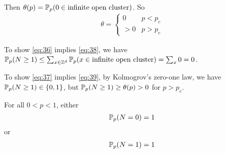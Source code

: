 Then $\theta(p) = \Prob_{p}(0 \in \text{infinite open cluster})$. So
\begin{align}
  \theta =
  \begin{cases}
    0 & p  < p_{c} \\
    > 0 & p > p_{c}
  \end{cases}
\end{align}

To show \eqref{eq:36} implies \eqref{eq:38}, we have $\Prob_{p}(N \geq
1) \leq \sum_{x \in \Z^{d}}\Prob_{p}(x \in \text{infinite open
  cluster}) = \sum_{x} 0 = 0$.

To show \eqref{eq:37} implies \eqref{eq:39}, by Kolmogrov's zero-one law, we have $\Prob_{p}(N \geq 1) \in \{ 0, 1
\}$, but $\Prob_{p}(N \geq 1) \geq \theta(p) > 0$ for $p > p_{c}$.

\begin{thm}
  \label{defn:random_walks_on_graphs:19}
  For all $0 < p < 1$, either
  \begin{align}
    \label{eq:41}
    \Prob_{p}(N = 0) = 1
  \end{align} or
  \begin{align}
    \label{eq:42}
    \Prob_{p}(N = 1) = 1
  \end{align}
\end{thm}

